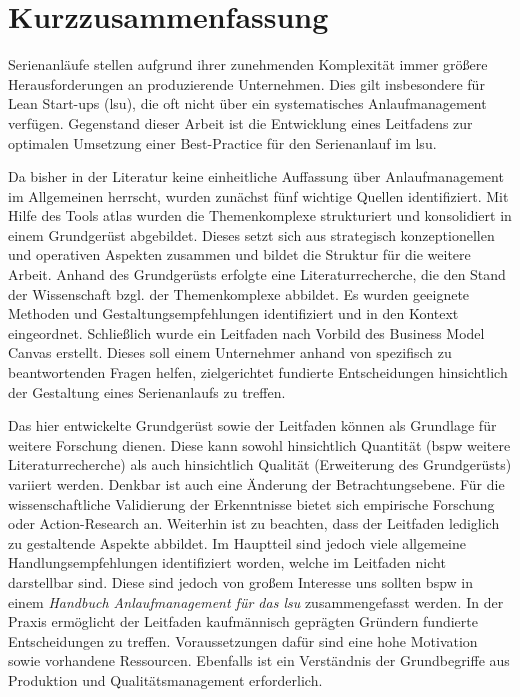 \chapter*{Kurzzusammenfassung}
Serienanläufe stellen aufgrund ihrer zunehmenden Komplexität immer größere Herausforderungen an produzierende Unternehmen. Dies gilt insbesondere für Lean Start-ups (\gls{lsu}), die oft nicht über ein systematisches Anlaufmanagement verfügen.
Gegenstand dieser Arbeit ist die Entwicklung eines Leitfadens zur optimalen Umsetzung einer Best-Practice für den Serienanlauf im \gls{lsu}.

Da bisher in der Literatur keine einheitliche Auffassung über Anlaufmanagement im Allgemeinen herrscht, wurden zunächst fünf wichtige Quellen identifiziert. Mit Hilfe des Tools \gls{atlas} wurden die Themenkomplexe strukturiert und konsolidiert in einem Grundgerüst abgebildet. Dieses setzt sich aus strategisch konzeptionellen und operativen Aspekten zusammen und bildet die Struktur für die weitere Arbeit. 
Anhand des Grundgerüsts erfolgte eine Literaturrecherche, die den Stand der Wissenschaft bzgl. der Themenkomplexe abbildet. Es wurden geeignete Methoden und Gestaltungsempfehlungen identifiziert und in den Kontext eingeordnet. 
Schließlich wurde ein Leitfaden nach Vorbild des Business Model Canvas erstellt. Dieses soll einem Unternehmer anhand von spezifisch zu beantwortenden Fragen helfen, zielgerichtet fundierte Entscheidungen hinsichtlich der Gestaltung eines Serienanlaufs zu treffen. 
% 

Das hier entwickelte Grundgerüst sowie der Leitfaden können als Grundlage für weitere Forschung dienen. Diese kann sowohl hinsichtlich Quantität (\gls{bspw} weitere Literaturrecherche) als auch hinsichtlich Qualität (Erweiterung des Grundgerüsts) variiert werden. Denkbar ist auch eine Änderung der Betrachtungsebene. Für die wissenschaftliche Validierung der Erkenntnisse bietet sich empirische Forschung oder Ac­tion-Re­search an. 
Weiterhin ist zu beachten, dass der Leitfaden lediglich zu gestaltende Aspekte abbildet. Im Hauptteil sind jedoch viele allgemeine Handlungsempfehlungen identifiziert worden, welche im Leitfaden nicht darstellbar sind. Diese sind jedoch von großem Interesse uns sollten \gls{bspw} in einem \textit{Handbuch Anlaufmanagement für das \gls{lsu}} zusammengefasst werden.
% 
In der Praxis ermöglicht der Leitfaden kaufmännisch geprägten Gründern fundierte Entscheidungen zu treffen. Voraussetzungen dafür sind eine hohe Motivation sowie vorhandene Ressourcen. Ebenfalls ist ein Verständnis der Grundbegriffe aus Produktion und Qualitätsmanagement erforderlich. 

